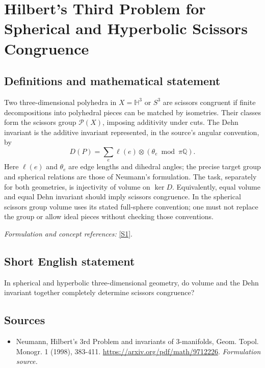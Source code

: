 \documentclass[11pt]{article}
\begin{document}
\section*{\texorpdfstring{Hilbert's Third Problem for Spherical and Hyperbolic Scissors Congruence}{Hilbert's Third Problem for Spherical and Hyperbolic Scissors Congruence}}\label{369}
\subsection{Definitions and mathematical statement}
Two three-dimensional polyhedra in $X=\mathbb H^3$ or $S^3$ are scissors congruent if finite decompositions into polyhedral pieces can be matched by isometries. Their classes form the scissors group $\mathcal P(X)$, imposing additivity under cuts. The Dehn invariant is the additive invariant represented, in the source's angular convention, by
\[
 D(P)=\sum_{e}\ell(e)\otimes(\theta_e\bmod\pi{\mathbb{Q}}).
\]
Here $\ell(e)$ and $\theta_e$ are edge lengths and dihedral angles; the precise target group and spherical relations are those of Neumann's formulation. The task, separately for both geometries, is injectivity of volume on $\ker D$. Equivalently, equal volume and equal Dehn invariant should imply scissors congruence. In the spherical scissors group volume uses its stated full-sphere convention; one must not replace the group or allow ideal pieces without checking those conventions.
\par\smallskip\textit{Formulation and concept references:} \href{https://arxiv.org/pdf/math/9712226}{[S1]}.

\subsection{Short English statement}
In spherical and hyperbolic three-dimensional geometry, do volume and the Dehn invariant together completely determine scissors congruence?
\subsection{Sources}
\begin{itemize}
\item[S1]Neumann, Hilbert's 3rd Problem and invariants of 3-manifolds, Geom. Topol. Monogr. 1 (1998), 383-411.
\url{https://arxiv.org/pdf/math/9712226}.
\textit{Formulation source.}
\end{itemize}
\end{document}
